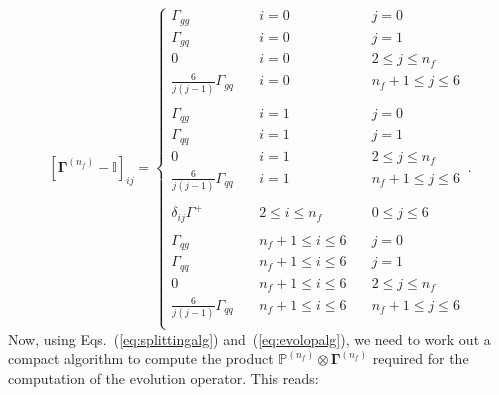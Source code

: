 \documentclass[10pt,a4paper]{article}
\begin{document}
\begin{equation}\label{eq:evolopalg}
  \left[{\bm\Gamma}^{(n_f)}-\mathbb{I}\right]_{ij}=
  \left\{
\begin{array}{lll}
\Gamma_{gg} & \quad i = 0 &\quad j = 0\\
\Gamma_{gq} & \quad i = 0 & \quad j=1\\
0 &\quad i = 0 & \quad 2 \leq j \leq n_f\\
\frac{6}{j(j-1)}\Gamma_{gq} &\quad i = 0 & \quad n_f+1 \leq j \leq 6\\
\\
\Gamma_{qg} & \quad i = 1 & \quad j = 0\\
\Gamma_{qq} & \quad i = 1 & \quad j = 1\\
0 &\quad i = 1 & \quad 2 \leq j \leq n_f\\
\frac{6}{j(j-1)}\Gamma_{qq} &\quad i = 1 & \quad n_f+1 \leq j \leq 6\\
\\
\delta_{ij}\Gamma^+ & \quad 2 \leq i \leq n_f & \quad 0 \leq j \leq 6\\
\\
\Gamma_{qg} & \quad n_f+1 \leq i \leq 6  &\quad j = 0\\
\Gamma_{qq} & \quad n_f+1 \leq i \leq 6  & \quad j=1\\
0 &\quad n_f+1 \leq i \leq 6 & \quad 2 \leq j \leq n_f\\
\frac{6}{j(j-1)}\Gamma_{qq} &\quad n_f+1 \leq i \leq 6 & \quad n_f+1 \leq j \leq 6\\
\end{array}
\right.\,.
\end{equation}
Now, using Eqs.~(\ref{eq:splittingalg}) and~(\ref{eq:evolopalg}), we
need to work out a compact algorithm to compute the product
$\mathbb{P}^{(n_f)}\otimes {\bm\Gamma}^{(n_f)}$ required for the computation
of the evolution operator. This reads:
\end{document}
